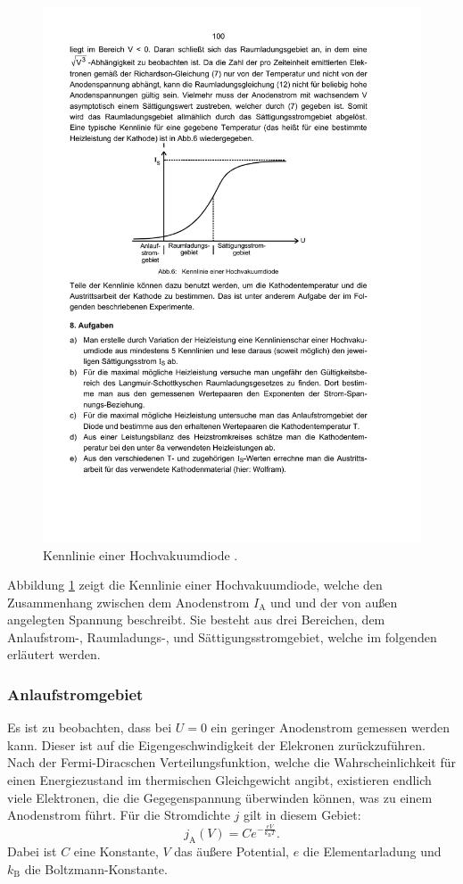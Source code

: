 \begin{figure}
  \centering
  \includegraphics[scale=0.8]{content/kennlinie.pdf}
\caption{Kennlinie einer Hochvakuumdiode \cite{anleitung504}.}
  \label{fig:kennlinie}
\end{figure}

Abbildung \ref{fig:kennlinie} zeigt die Kennlinie einer Hochvakuumdiode, welche den Zusammenhang zwischen dem Anodenstrom $I_\mathrm{A}$ und und der von außen angelegten Spannung beschreibt. Sie besteht aus drei Bereichen, dem Anlaufstrom-, Raumladungs-, und Sättigungsstromgebiet, welche im folgenden erläutert werden.

\subsubsection{Anlaufstromgebiet}
Es ist zu beobachten, dass bei $U=0$ ein geringer Anodenstrom gemessen werden kann. Dieser ist auf die Eigengeschwindigkeit der Elekronen zurückzuführen.
Nach der Fermi-Diracschen Verteilungsfunktion, welche die Wahrscheinlichkeit für einen Energiezustand im thermischen Gleichgewicht angibt, existieren endlich viele Elektronen, die die Gegegenspannung überwinden können, was zu einem Anodenstrom führt.
Für die Stromdichte $j$ gilt in diesem Gebiet:
\begin{equation}
  \label{eqn:anlauf}
  j_\mathrm{A}(V)=C e^{-\frac{e V}{k_\mathrm{B}T}}.
\end{equation}
Dabei ist $C$ eine Konstante, $V$ das äußere Potential, $e$ die Elementarladung und $k_\mathrm{B}$ die Boltzmann-Konstante.

